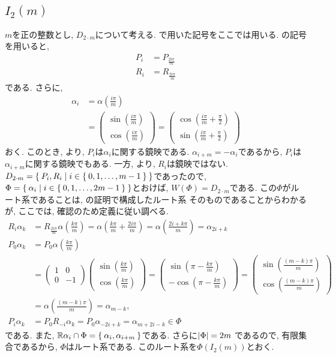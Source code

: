 \subsection{$I_2(m)$}
\label{ex:i2m:root}
$m$を正の整数とし,
$D_{2\cdot m}$について考える.
で用いた記号をここでは用いる.
の記号を用いると,
\begin{align*}
  P_i&=P_{\frac{2i\pi}{m}}\\
  R_i&=R_{\frac{2i\pi}{m}}
\end{align*}
である. さらに,
\begin{align*}
  \alpha_i&=\alpha(\frac{i\pi}{m})\\
  &=
  \begin{pmatrix}
    \sin(\frac{i\pi}{m})\\
    \cos(\frac{i\pi}{m})
  \end{pmatrix}
  =
  \begin{pmatrix}
    \cos(\frac{i\pi}{m}+\frac{\pi}{2})\\
    \sin(\frac{i\pi}{m}+\frac{\pi}{2})
  \end{pmatrix} 
\end{align*}
おく. 
このとき,
より, $P_i$は$\alpha_i$に関する鏡映である.
$\alpha_{i+m}=-\alpha_i$であるから,  $P_i$は$\alpha_{i+m}$に関する鏡映でもある.
一方, より, $R_i$は鏡映ではない.
$D_{2\cdot m}=\Set{P_i,R_i|i \in \Set{0,1,\ldots,m-1}}$であったので,
$\Phi=\Set{\alpha_i | i \in \Set{0,1,\ldots,2m-1} }$とおけば,
$W(\Phi)=D_{2\cdot m}$である.
この$\Phi$がルート系であることは,
の証明で構成したルート系
そのものであることからわかるが,
ここでは, 確認のため定義に従い調べる.
\begin{align*}
  R_i\alpha_k&=R_{\frac{2i\pi}{m}}\alpha(\frac{k\pi}{m})
  =\alpha(\frac{k\pi}{m}+\frac{2i\pi}{m})
  =\alpha(\frac{2i+k\pi}{m})
  =\alpha_{2i+k}\\
  P_0\alpha_k&=P_0\alpha(\frac{k\pi}{m})\\
  &=
  \begin{pmatrix}
    1 & 0 \\
    0 & -1
  \end{pmatrix}
  \begin{pmatrix}
    \sin(\frac{k\pi}{m}) \\
    \cos(\frac{k\pi}{m}) 
  \end{pmatrix}
=  \begin{pmatrix}
    \sin(\pi-\frac{k\pi}{m}) \\
    -\cos(\pi-\frac{k\pi}{m}) 
  \end{pmatrix}
=  \begin{pmatrix}
    \sin(\frac{(m-k)\pi}{m}) \\
    \cos(\frac{(m-k)\pi}{m}) 
\end{pmatrix}\\
&=\alpha(\frac{(m-k)\pi}{m})=\alpha_{m-k},
\\
P_i\alpha_k&=P_0R_{-i}\alpha_k
=P_0\alpha_{-2i+k}
=\alpha_{m+2i-k} \in \Phi
\end{align*}
である.
また,
$\mathbb{R}\alpha_i \cap \Phi=\Set{\alpha_i,\alpha_{i+m}}$である.
さらに$\left|\Phi\right|=2m$
であるので, 有限集合であるから,
$\Phi$はルート系である.
このルート系を$\Phi(I_2(m))$とおく.

